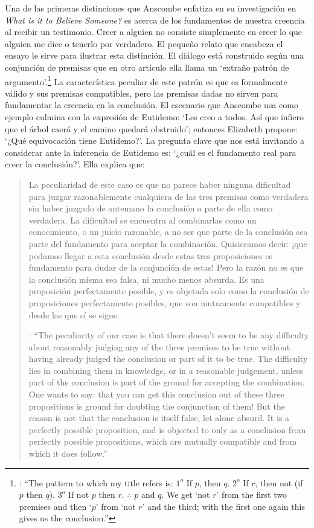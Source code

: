 Una de las primeras distinciones que Anscombe enfatiza en su investigación en \emph{What is it to Believe Someone?} es acerca de los fundamentos de nuestra creencia al recibir un testimonio. Creer a alguien no consiste simplemente en creer lo que alguien me dice o tenerlo por verdadero. El pequeño relato que encabeza el ensayo le sirve para ilustrar esta distinción. El diálogo está construido según una conjunción de premisas que en otro artículo ella llama un `extraño patrón de argumento'.\footnote{\cite[Cf.~][299]{anscombe2015logic:qpa}: \enquote{The pattern to which my title refers is: $1^{o}$ If $p$, then $q$. $2^{o}$ If $r$, then not (if $p$ then $q$). $3^{o}$ If not $p$ then $r$. $\mathbf{\therefore}$ $p$ and $q$. We get `not $r$' from the first two premises and then `$p$' from `not $r$' and the third; with the first one again this gives us the conclusion.}} La característica peculiar de este patrón es que es formalmente válido y sus premisas compatibles, pero las premisas dadas no sirven para fundamentar la creencia en la conclusión. El escenario que Anscombe usa como ejemplo culmina con la expresión de Eutidemo: \enquote*{Les creo a todos. Así que infiero que el árbol caerá y el camino quedará obstruido}; entonces Elizabeth propone: \enquote*{¿Qué equivocación tiene Eutidemo?}. La pregunta clave que nos está invitando a considerar ante la inferencia de Eutidemo es: \enquote*{¿cuál es el fundamento real para creer la conclusión?}. Ella explica que: \blockquote[{\cite[301]{anscombe2015logic:qpa}}: \enquote{The peculiarity of our case is that there doesn't seem to be any difficulty about reasonably judging any of the three premises to be true without having already judged the conclusion or part of it to be true. The difficulty lies in combining them in knowledge, or in a reasonable judgement, unless part of the conclusion is part of the ground for accepting the combination. One wants to say: that you can get this conclusion out of these three propositions is ground for doubting the conjunction of them! But the reason is not that the conclusion is itself false, let alone absurd. It is a perfectly possible proposition, and is objected to only as a conclusion from perfectly possible propositions, which are mutually compatible and from which it does follow.}]{La peculiaridad de este caso es que no parece haber ninguna dificultad para juzgar razonablemente cualquiera de las tres premisas como verdadera sin haber juzgado de antemano la conclusión o parte de ella como verdadera. La dificultad se encuentra al combinarlas como un conocimiento, o un juicio razonable, a no ser que parte de la conclusión sea parte del fundamento para aceptar la combinación. Quisieramos decir: ¡que podamos llegar a esta conclusión desde estas tres proposiciones es fundamento para dudar de la conjunción de estas! Pero la razón no es que la conclusión misma sea falsa, ni mucho menos absurda. Es una proposición perfectamente posible, y es objetada solo como la conclusión de proposiciones perfectamente posibles, que son mutuamente compatibles y desde las que sí se sigue.}

